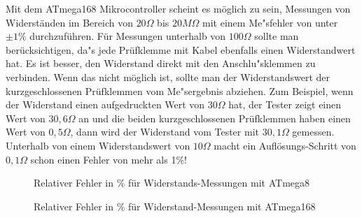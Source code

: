 Mit dem ATmega168 Mikrocontroller scheint es m\"oglich zu sein, Messungen von Widerst\"anden im
Bereich von \(20\Omega\) bis \(20M\Omega\) mit einem Me"sfehler von unter \(\pm1\%\) durchzuf\"uhren.
F\"ur Messungen unterhalb von \(100\Omega\) sollte man ber\"ucksichtigen, da"s jede Pr\"ufklemme mit Kabel ebenfalls
einen Widerstandwert hat.
Es ist besser, den Widerstand direkt mit den Anschlu"sklemmen zu verbinden.
Wenn das nicht m\"oglich ist, sollte man der Widerstandswert der kurzgeschlossenen Pr\"ufklemmen vom Me"sergebnis abziehen.
Zum Beispiel, wenn der Widerstand einen aufgedruckten Wert von \(30\Omega\) hat, der Tester zeigt
einen Wert von \(30,6\Omega\) an
und die beiden kurzgeschlossenen Pr\"ufklemmen haben einen Wert von \(0,5\Omega\), dann wird der Widerstand vom
Tester mit \(30,1\Omega\) gemessen.
Unterhalb von einem Widerstandswert von \(10\Omega\) macht ein Aufl\"osungs-Schritt von \(0,1\Omega\) schon einen Fehler von mehr als 1\%!

\begin{figure}[H]
\centering

\caption{Relativer Fehler in \% f\"ur Widerstands-Messungen mit ATmega8 }
\label{fig:mega8res}
\end{figure}

\begin{figure}[H]
\centering

\caption{Relativer Fehler in \% f\"ur Widerstand-Messungen mit ATmega168 }
\label{fig:mega168res}
\end{figure}
